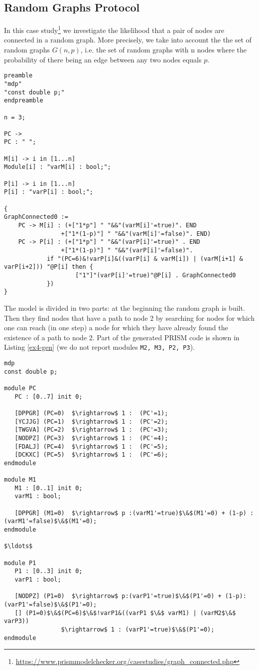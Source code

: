 \subsection{Random Graphs Protocol}
In this case study\footnote{\url{https://www.prismmodelchecker.org/casestudies/graph_connected.php}} we investigate the likelihood that a pair of nodes are connected in a
 random graph. More precisely, we take into account the the set of random graphs $G(n,p)$,
  i.e. the set of random graphs with n nodes where the probability of there being an edge 
  between any two nodes equals $p$. 

\begin{lstlisting}[style=chor-color,caption={Choreographic language for the Random Graphs
	Protocol.},captionpos=b,label={ex4-code}]
	preamble
"mdp"
"const double p;"
endpreamble

n = 3;

PC -> 
PC : " ";

M[i] -> i in [1...n]
Module[i] : "varM[i] : bool;";

P[i] -> i in [1...n]
P[i] : "varP[i] : bool;";

{
GraphConnected0 := 
	PC -> M[i] : (+["1*p"] " "&&"(varM[i]'=true)". END
		        +["1*(1-p)"] " "&&"(varM[i]'=false)". END)
	PC -> P[i] : (+["1*p"] " "&&"(varP[i]'=true)" . END
		        +["1*(1-p)"] " "&&"(varP[i]'=false)".
			if "(PC=6)&!varP[i]&((varP[i] & varM[i]) | (varM[i+1] & varP[i+2])) "@P[i] then {
					["1"]"(varP[i]'=true)"@P[i] . GraphConnected0
			}) 								  
}
\end{lstlisting}
The model is divided in two parts: at the beginning the random graph is built.
Then they find nodes that have a path to node 2 by searching for nodes for which one can reach (in one step) a node for which they have already found the existence of a path to node 2.
Part of the generated PRISM code is shown in Listing \ref{ex4-gen} (we do not report modules \texttt{M2, M3, P2, P3}).
\begin{lstlisting}[style=prism-color,caption={Generated PRISM program for the Random Graphs
	Protocol.},captionpos=b,label={ex4-gen}]
mdp
const double p;
	
module PC
   PC : [0..7] init 0;
	
   [DPPGR] (PC=0)  $\rightarrow$ 1 :  (PC'=1); 
   [YCJJG] (PC=1)  $\rightarrow$ 1 :  (PC'=2); 
   [TWGVA] (PC=2)  $\rightarrow$ 1 :  (PC'=3); 
   [NODPZ] (PC=3)  $\rightarrow$ 1 :  (PC'=4); 
   [FDALJ] (PC=4)  $\rightarrow$ 1 :  (PC'=5); 
   [DCKXC] (PC=5)  $\rightarrow$ 1 :  (PC'=6); 
endmodule

module M1
   M1 : [0..1] init 0;
   varM1 : bool; 

   [DPPGR] (M1=0)  $\rightarrow$ p :(varM1'=true)$\&$(M1'=0) + (1-p) :(varM1'=false)$\&$(M1'=0); 
endmodule	

$\ldots$

module P1
   P1 : [0..3] init 0;
   varP1 : bool; 

   [NODPZ] (P1=0)  $\rightarrow$ p:(varP1'=true)$\&$(P1'=0) + (1-p):(varP1'=false)$\&$(P1'=0); 
   [] (P1=0)$\&$(PC=6)$\&$!varP1&((varP1 $\&$ varM1) | (varM2$\&$ varP3))  
   				$\rightarrow$ 1 : (varP1'=true)$\&$(P1'=0); 
endmodule
\end{lstlisting}

